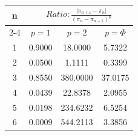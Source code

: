 \documentclass{article}
\providecommand{\abs}[1]{\lvert#1\rvert}
\begin{document}
\begin{tabular}{|c|c|c|c|}
\hline
\multirow{2}{*}{n} & \multicolumn{3}{|c|}{$Ratio:\displaystyle\frac{\abs{\pi_{n+1}-\pi_{n}}}{({\pi_{n}-\pi_{n-1}})^p}$} \\
\cline{2-4}
 & $p=1$ & $p=2$ & $p=\Phi$ \\
\hline
 1 & 0.9000 & 18.0000 & 5.7322 \\ 
  2 & 0.0500 & 1.1111 & 0.3399 \\ 
  3 & 0.8550 & 380.0000 & 37.0175 \\ 
  4 & 0.0439 & 22.8378 & 2.0955 \\ 
  5 & 0.0198 & 234.6232 & 6.5254 \\ 
  6 & 0.0009 & 544.2113 & 3.3856 \\ 
 \hline 
\end{tabular}
\end{document}
